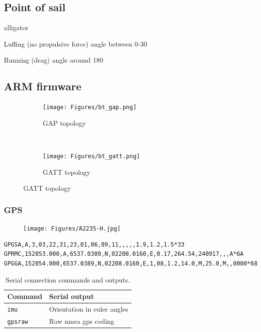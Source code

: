 \subsection{Point of sail}
\begin{labeling}{alligator}
\item [Luffing] (no propulsive force) angle between 0-30\degree
\item [Running] (drag) angle around 180\degree
\end{labeling}

\subsection{ARM firmware}

\begin{figure}[H]
	\centering
	\begin{subfigure}[t]{height = 4\baselineskip}
	\texttt{[image: Figures/bt\_gap.png]}
	\caption{GAP topology}
	\label{bt-gap}
	\end{subfigure}
	~
	\begin{subfigure}[t]{height = 4\baselineskip}
	\texttt{[image: Figures/bt\_gatt.png]}
	\caption{ GATT topology}
	\label{bt-gatt}
	\end{subfigure}
	\label{bt-tops}
\end{figure}

\subsubsection{GPS}
\begin{figure}[H]
\centering
\texttt{[image: Figures/A2235-H.jpg]}
\label{gps-figure}
\end{figure}

\begin{lstlisting}
GPGSA,A,3,03,22,31,23,01,06,09,11,,,,,1.9,1.2,1.5*33
GPRMC,152053.000,A,6537.0389,N,02208.0160,E,0.17,264.54,240917,,,A*6A
GPGGA,152054.000,6537.0389,N,02208.0160,E,1,08,1.2,14.0,M,25.0,M,,0000*68
\end{lstlisting}

\begin{table}[H]
\centering
\begin{tabular}{ l | l }
 	Command 		& Serial output \\
  	\hline
  	\texttt{imu} 		& Orientation in euler angles \\
  	\texttt{gpsraw} 	& Raw \gls{nmea} \gls{gps} coding\\
\end{tabular}
\caption{Serial connection commands and outputs.}
\label{table:serial}
\end{table}

